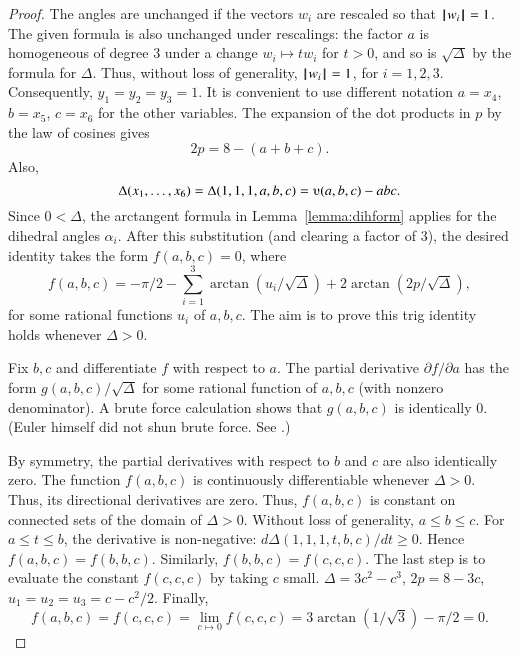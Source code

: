 \begin{proof}
The angles are unchanged if the vectors $w_i$ are rescaled so that
${{\hskip0.1em|\hskip-0.15em|\hskip0.1em}w_i{\hskip0.1em|\hskip-0.15em|\hskip0.1em}}=1$.  The given formula is also unchanged under rescalings:
the factor $a$ is homogeneous of degree $3$ under a change $w_i
\mapsto t w_i$ for $t>0$, and so is $\sqrt{\Delta}$ by the
formula for $\Delta$.  Thus, without loss of generality, ${{\hskip0.1em|\hskip-0.15em|\hskip0.1em}w_i{\hskip0.1em|\hskip-0.15em|\hskip0.1em}}=1$, for
$i=1,2,3$.  Consequently, $y_1=y_2=y_3=1$.  It is convenient to use
different notation $a=x_4$, $b=x_5$, $c=x_6$ for the other
variables. The expansion of the dot products in $p$ by the law of cosines
gives
    $$2 p = 8 - (a+b+c).$$
Also, $$\Delta(x_1,\ldots,x_6) = \Delta(1,1,1,a,b,c) =
    \ups(a,b,c) - a b c.$$
Since $0 <\Delta$, the arctangent formula
in Lemma~\ref{lemma:dihform} 
applies for the dihedral angles $\alpha_i$.  After
this substitution (and clearing a factor of $3$),  %
the desired identity takes the form $f(a,b,c)=0$, where
    $$
    f(a,b,c)= -\pi/2 - \sum_{i=1}^3\arctan(u_i/\sqrt{\Delta}) +
    2\arctan(2 p/\sqrt{\Delta}),
    $$
for some rational functions $u_i$ of $a,b,c$.   The aim is to prove this trig identity holds whenever $\Delta>0$.

Fix $b,c$ and differentiate $f$ with respect
to $a$.  The partial derivative $\partial f/\partial a$ has the form
$g(a,b,c)/\sqrt{\Delta}$ for some rational function of $a,b,c$ (with
nonzero denominator).  A brute force calculation shows that $g(a,b,c)$ is
identically $0$.  (Euler himself did not shun brute force.  See
\cite{Euler}.)

By symmetry, the partial derivatives with respect to $b$ and $c$ are
also identically zero.  The function $f(a,b,c)$  is continuously
differentiable whenever $\Delta>0$.  Thus, its directional
derivatives are zero.  Thus, $f(a,b,c)$ is constant on connected
sets of the domain of $\Delta>0$.  Without loss of generality, $a\le b\le c$.  For $a\le t\le b$,  the derivative is non-negative:
$d\Delta(1,1,1,t,b,c)/dt\ge 0$. Hence $f(a,b,c)=f(b,b,c)$. 
Similarly,
 $f(b,b,c)=f(c,c,c)$. 
The last step is to evaluate the constant $f(c,c,c)$
by taking $c$ small.
$\Delta=3c^2-c^3$, $2p= 8-3c$,  $u_1=u_2=u_3 = c -c^2/2$.   Finally,
    $$f(a,b,c)= f(c,c,c) = \lim_{c\mapsto0} f(c,c,c) = 
    3 \arctan(1/\sqrt3)-\pi/2 =0.$$
\end{proof}
%






